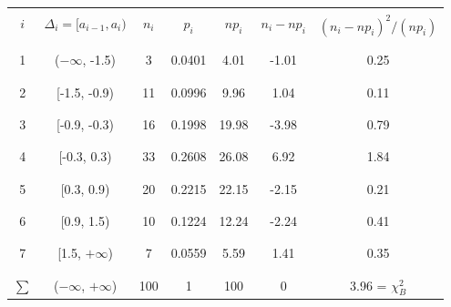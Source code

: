 \documentclass[../body.tex]{subfiles}
\begin{document}
\begin{enumerate}
	\begin{table}[H]
		\centering
		\begin{tabular}{| c | c | c | c | c | c | c |}
			\hline \hline
			&  &  &  &  &  & \\
			$i$   & $\Delta_i = [a_{i-1}, a_i)$   &   $n_i$ &   $p_i$ &   $np_i$ &   $n_i - np_i$ &   $(n_i - np_i)^2/(np_i)$ \\
			&  &  &  &  &  & \\
			\hline
			&  &  &  &  &  & \\
			1     & ($-\infty$, -1.5)           &       3 &  0.0401 &     4.01 &          -1.01 &                            0.25 \\ 
			&  &  &  &  &  & \\\hline &  &  &  &  &  & \\
			2     & [-1.5, -0.9)                &      11 &  0.0996 &     9.96 &           1.04 &                            0.11 \\ 
			&  &  &  &  &  & \\\hline &  &  &  &  &  & \\
			3     & [-0.9, -0.3)                &      16 &  0.1998 &    19.98 &          -3.98 &                            0.79 \\ 
			&  &  &  &  &  & \\\hline &  &  &  &  &  & \\
			4     & [-0.3, 0.3)                 &      33 &  0.2608 &    26.08 &           6.92 &                            1.84 \\ 
			&  &  &  &  &  & \\\hline &  &  &  &  &  & \\
			5     & [0.3, 0.9)                  &      20 &  0.2215 &    22.15 &          -2.15 &                            0.21 \\ 
			&  &  &  &  &  & \\\hline &  &  &  &  &  & \\
			6     & [0.9, 1.5)                  &      10 &  0.1224 &    12.24 &          -2.24 &                            0.41 \\ 
			&  &  &  &  &  & \\\hline &  &  &  &  &  & \\
			7     & [1.5, $+\infty$)             &       7 &  0.0559 &     5.59 &           1.41 &                            0.35 \\ 
			&  &  &  &  &  & \\\hline &  &  &  &  &  & \\
			$\sum$& ($-\infty$, $+\infty$)                           &     100 &  1      &   100    &           0    &                            3.96 = $\chi_B^2$ \\

\end{tabular}
\end{table}
\end{enumerate}
\end{document}

